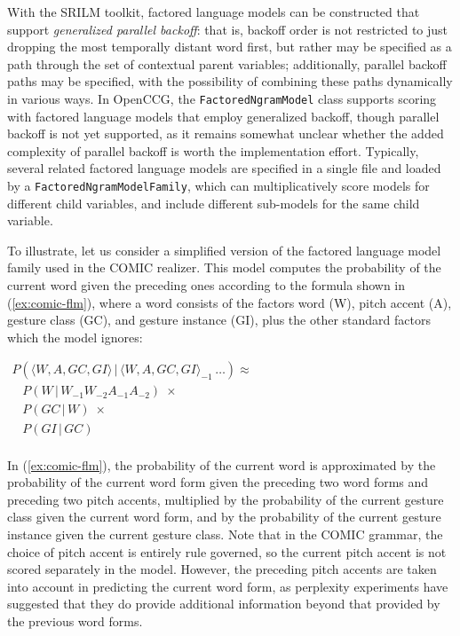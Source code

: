 \documentclass[11pt]{article}
\newcommand{\code}[1]{\texttt{#1}} %
\newcommand{\eref}[2][]{(\ref{ex:#2}#1)} %
\begin{document}
With the SRILM toolkit, factored language models can be constructed that
support \textit{generalized parallel backoff}: that is, backoff order is
not restricted to just dropping the most temporally distant word first,
but rather may be specified as a path through the set of contextual
parent variables; additionally, parallel backoff paths may be specified,
with the possibility of combining these paths dynamically in various
ways. In OpenCCG, the \code{Factored\-Ngram\-Model} class supports
scoring with factored language models that employ generalized backoff,
though parallel backoff is not yet supported, as it remains somewhat
unclear whether the added complexity of parallel backoff is worth the
implementation effort. Typically, several related factored language
models are specified in a single file and loaded by a
\code{Factored\-Ngram\-Model\-Family}, which can multiplicatively score
models for different child variables, and include different sub-models
for the same child variable.

To illustrate, let us consider a simplified version of the factored
language model family used in the COMIC realizer. This model computes
the probability of the current word given the preceding ones according
to the formula shown in \eref{comic-flm}, where a word consists of the
factors word (W), pitch accent (A), gesture class (GC), and gesture
instance (GI), plus the other standard factors which the model ignores:

\begin{exe}
\ex \label{ex:comic-flm}
\begin{small}
\(
\begin{array}{l}
P(\langle W,A,GC,GI \rangle \, | \, \langle W,A,GC,GI \rangle_{-1} \, \ldots) \approx  \\
\; \; \; P(W \, | \, W_{-1} W_{-2} A_{-1} A_{-2}) \; \times \\
\; \; \; P(GC \, | \, W) \; \times \\
\; \; \; P(GI \, | \, GC) \\
\end{array}
\)
\end{small}
\end{exe}

\noindent In \eref{comic-flm}, the probability of the current word is
approximated by the probability of the current word form given the
preceding two word forms and preceding two pitch accents, multiplied by
the probability of the current gesture class given the current word
form, and by the probability of the current gesture instance given the
current gesture class. Note that in the COMIC grammar, the choice of
pitch accent is entirely rule governed, so the current pitch accent is
not scored separately in the model. However, the preceding pitch accents
are taken into account in predicting the current word form, as
perplexity experiments have suggested that they do provide additional
information beyond that provided by the previous word forms.
\end{document}

